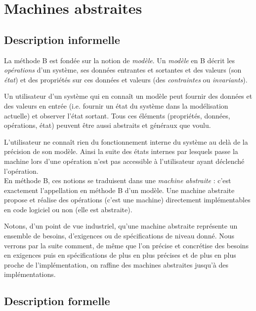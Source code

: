 \documentclass[10pt,a4paper]{article}
\begin{document}
\section{Machines abstraites}

\subsection{Description informelle}

La méthode B est fondée sur la notion de \emph{modèle}. Un \emph{modèle} en B décrit les \emph{opérations} d'un système, ses données entrantes et sortantes et des valeurs (son \emph{état}) et des propriétés sur ces données et valeurs (des \emph{contraintes} ou \emph{invariants}).

Un utilisateur d'un système qui en connaît un modèle peut fournir des données et des valeurs en entrée (i.e. fournir un état du système dans la modélisation actuelle) et observer l'état sortant. Tous ces  éléments (propriétés, données, opérations, état) peuvent être aussi abstraits et généraux que voulu.

L'utilisateur ne connaît rien du fonctionnement interne du système au delà de la précision de son modèle. Ainsi la suite des états internes par lesquels passe la machine lors d'une opération n'est pas accessible à l'utilisateur ayant déclenché l'opération.
\\

En méthode B, ces notions se traduisent dans une \emph{machine abstraite} : c'est exactement l'appellation en méthode B d'un modèle. Une machine abstraite propose et réalise des opérations (c'est une machine) directement implémentables en code logiciel ou non (elle est abstraite).

Notons, d'un point de vue industriel, qu'une machine abstraite représente un ensemble de besoins, d'exigences ou de spécifications de niveau donné. Nous verrons par la suite comment, de même que l'on précise et concrétise des besoins en exigences puis en spécifications de plus en plus précises et de plus en plus proche de l'implémentation, on raffine des machines abstraites jusqu'à des implémentations.

\subsection{Description formelle}
\end{document}
